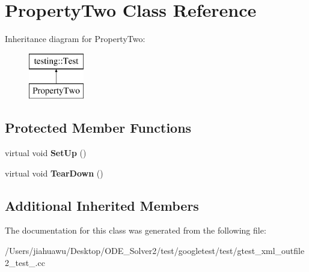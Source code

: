 \hypertarget{class_property_two}{}\section{Property\+Two Class Reference}
\label{class_property_two}
Inheritance diagram for Property\+Two\+:\begin{figure}[H]
\begin{center}
\leavevmode
\includegraphics[height=2.000000cm]{class_property_two}
\end{center}
\end{figure}
\subsection*{Protected Member Functions}
\begin{DoxyCompactItemize}
\item 
\mbox{\label{class_property_two_aa3ab39cf4e6c751cb0788c575bf92ca2}} 
virtual void {\bfseries Set\+Up} ()
\item 
\mbox{\label{class_property_two_aa4ffb2b9dddeba69f0f9baf133f06ef2}} 
virtual void {\bfseries Tear\+Down} ()
\end{DoxyCompactItemize}
\subsection*{Additional Inherited Members}


The documentation for this class was generated from the following file\+:\begin{DoxyCompactItemize}
\item 
/\+Users/jiahuawu/\+Desktop/\+O\+D\+E\+\_\+\+Solver2/test/googletest/test/gtest\+\_\+xml\+\_\+outfile2\+\_\+test\+\_\+.\+cc\end{DoxyCompactItemize}
